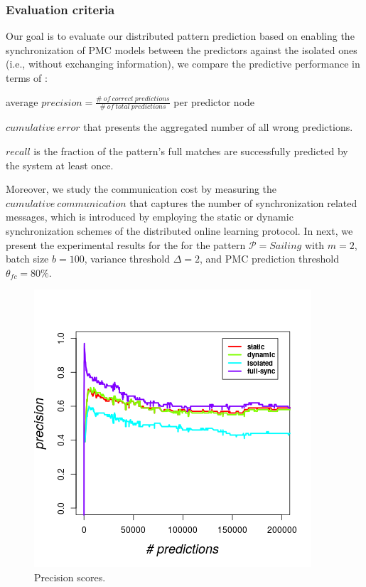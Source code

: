 \subsubsection*{Evaluation criteria} Our goal is to evaluate our distributed pattern prediction based on enabling the synchronization of PMC models between the predictors against the isolated ones (i.e., without exchanging information), we compare the predictive performance in terms of :
\begin{enumerate*}[label=(\roman*)]
	
\item  average $\mathit{precision = \frac{\#\ of\ correct\ predictions}{\#\ of\ total\ predictions}}$ per predictor node

\item $\mathit{cumulative\ error}$ that presents the aggregated number of all wrong predictions.

\item $\mathit{recall}$ is the fraction of the pattern's full matches are successfully predicted by the system at least once. 

\end{enumerate*} 
Moreover, we study the communication cost by measuring the $\mathit{cumulative\ communication}$ that captures the number of  synchronization related messages, which is introduced by employing the static or dynamic synchronization schemes of the distributed online learning protocol. In next, we present the experimental results for the for the pattern  $\mathcal{P}=Sailing$ with $m=2$, batch size $b=100$,  variance threshold $\Delta=2$, and PMC prediction threshold $\theta_{fc}=80\%$.

\begin{figure}[]
	
	\includegraphics[width=.5\textwidth]{figures/precision.png}
	
	\caption{Precision scores.}
	\label{fig:precsions}
\end{figure}

